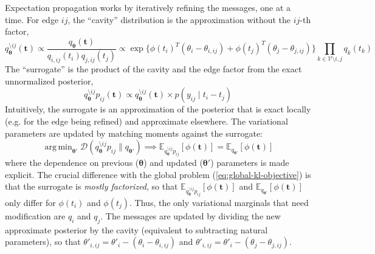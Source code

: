 \documentclass{article}
\DeclareMathOperator*{\argmin}{arg\,min}
\begin{document}
Expectation propagation works by iteratively refining the messages, one at a time. 
For edge $ij$, the ``cavity'' distribution is the approximation without the $ij$-th factor,
\[
q^{\setminus ij}_{\bm \theta}(\bm t) \propto \frac{q_{\bm \theta}(\bm t)}{q_{i,ij}(t_i) q_{j,ij}(t_j)} \propto \exp\{ \phi(t_i)^T (\theta_i - \theta_{i,ij}) + \phi(t_j)^T (\theta_j - \theta_{j,ij})\} \prod_{k \in \mathcal{V} \setminus i,j} q_k(t_k)
\]
The ``surrogate'' is the product of the cavity and the edge factor from the exact unnormalized posterior,
\[
q^{\setminus ij}_{\bm \theta} p_{ij} (\bm t) \propto q^{\setminus ij}_{\bm \theta}(\bm t) \times p(y_{ij} \mid t_i - t_j)
\]
Intuitively, the surrogate is an approximation of the posterior that is exact locally 
(e.g. for the edge being refined) and approximate elsewhere. 
The variational parameters are updated by matching moments against the surrogate:
\[
\argmin_{\bm \theta'} \mathcal{D}( q^{\setminus ij}_{\bm \theta} p_{ij} \| q_{\bm \theta'} ) \implies \mathbb{E}_{q^{\setminus ij}_{\bm \theta} p_{ij}}[\phi(\bm t)] = \mathbb{E}_{q_{\bm \theta'}}[\phi(\bm t)]
\]
where the dependence on previous ($\bm \theta$) and updated ($\bm \theta'$) parameters is made explicit. 
The crucial difference with the global problem (\ref{eq:global-kl-objective}) is that the surrogate is \emph{mostly factorized}, 
so that $\mathbb{E}_{q^{\setminus ij}_{\bm \theta} p_{ij}}[\phi(\bm t)]$ and $\mathbb{E}_{q_{\bm \theta'}}[\phi(\bm t)]$ only differ for $\phi(t_i)$ and $\phi(t_j)$. 
Thus, the only variational marginals that need modification are $q_{i}$ and $q_{j}$. 
The messages are updated by dividing the new approximate posterior by the cavity (equivalent to subtracting natural parameters), 
so that $\theta'_{i,ij} = \theta'_i - (\theta_i - \theta_{i,ij})$ and 
$\theta'_{i,ij} = \theta'_i - (\theta_j - \theta_{j,ij})$. 
\end{document}
